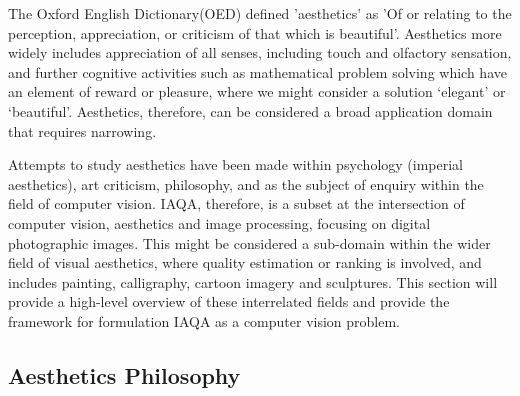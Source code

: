 The Oxford English Dictionary(OED) defined 'aesthetics' as 'Of or relating to the perception, appreciation, or criticism of that which is beautiful'\cite{OED2021}. Aesthetics more widely includes appreciation of all senses, including touch and olfactory sensation\cite{Hayes2015}, and further cognitive activities such as mathematical problem solving which have an element of reward or pleasure, where we might consider a solution `elegant' or `beautiful'\cite{Rolls2014}. Aesthetics, therefore, can be considered a broad application domain that requires narrowing.  

\par

 Attempts to study aesthetics have been made within psychology (imperial aesthetics)\cite{Greb2017}, art criticism, philosophy, and as the subject of enquiry within the field of computer vision. IAQA, therefore, is a subset at the intersection of computer vision, aesthetics and image processing, focusing on digital photographic images. This might be considered a sub-domain within the wider field of visual aesthetics, where quality estimation or ranking is involved, and includes painting, calligraphy, cartoon imagery and sculptures. This section will provide a high-level overview of these interrelated fields and provide the framework for formulation IAQA as a computer vision problem. 

\subsection{Aesthetics Philosophy}

